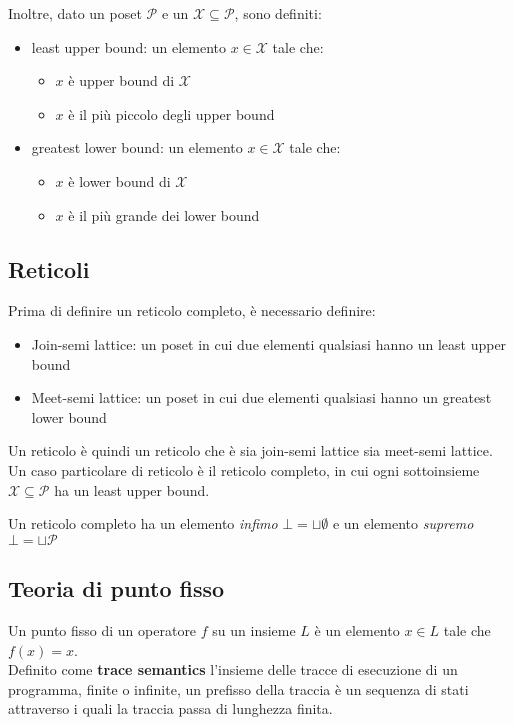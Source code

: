 \documentclass[a4paper, 10pt]{article}
\begin{document}
	\noindent
	Inoltre, dato un poset $\mathcal{P}$ e un $\mathcal{X} \subseteq \mathcal{P}$, sono definiti:
	\begin{itemize}
		\item least upper bound: un elemento $x \in \mathcal{X}$ tale che:
		\begin{itemize}
			\item $x$ è upper bound di $\mathcal{X}$
			\item $x$ è il più piccolo degli upper bound
		\end{itemize}
		\item greatest lower bound: un elemento $x \in \mathcal{X}$ tale che:
		\begin{itemize}
			\item $x$ è lower bound di $\mathcal{X}$
			\item $x$ è il più grande dei lower bound
		\end{itemize}
	\end{itemize}
	
	\subsection{Reticoli}
	Prima di definire un reticolo completo, è necessario definire:
	\begin{itemize}
		\item Join-semi lattice: un poset in cui due elementi qualsiasi hanno un least upper bound
		\item Meet-semi lattice: un poset in cui due elementi qualsiasi hanno un greatest lower bound
	\end{itemize}
	
	Un reticolo è quindi un reticolo che è sia join-semi lattice sia meet-semi lattice. Un caso particolare di reticolo è il reticolo completo, in cui ogni sottoinsieme $\mathcal{X} \subseteq \mathcal{P}$ ha un least upper bound.
	
	Un reticolo completo ha un elemento \textit{infimo} $\bot = \sqcup \emptyset$ e un elemento \textit{supremo} $\bot = \sqcup \mathcal{P}$
	
	\subsection{Teoria di punto fisso}
	Un punto fisso di un operatore $f$ su un insieme $L$ è un elemento $x \in L$ tale che $f(x)=x$. \\
	
	Definito come \textbf{trace semantics} l'insieme delle tracce di esecuzione di un programma, finite o infinite, un prefisso della traccia è un sequenza di stati attraverso i quali la traccia passa di lunghezza finita.
	
\end{document}
